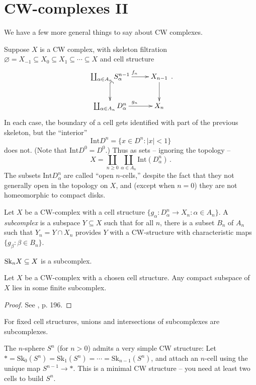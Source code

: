 \section{CW-complexes II}

We have a few more general things to say about CW complexes. 

Suppose $X$ is a CW complex, with skeleton filtration 
$\varnothing=X_{-1}\subseteq X_0\subseteq X_1\subseteq\cdots\subseteq X$ and 
cell structure
\begin{equation*}
\xymatrix{\coprod_{\alpha\in A_n}S^{n-1}_\alpha\ar[r]^{f_n}\ar@{^(->}[d] & X_{n-1}\ar[d]\\
\coprod_{\alpha\in A_n}D^n_\alpha\ar[r]^{g_n} & X_{n}}\,.
\end{equation*}
In each case, the boundary of a cell gets identified with part of the previous skeleton, but the ``interior''
\[
\mathrm{Int}D^n=\{x\in D^n:|x|<1\}
\]
does not. (Note that $\mathrm{Int}D^0=D^0$.) Thus as sets -- ignoring
the topology -- 
\[
X=\coprod_{n\geq 0}\coprod_{\alpha\in A_n}\mathrm{Int}(D^n_\alpha)\,.
\]
The subsets $\mathrm{Int}D^n_\alpha$ are called ``open $n$-cells,'' 
despite the fact that they not generally open in the topology on $X$,
and (except when $n=0$) they are not homeomorphic to compact disks.

\begin{definition}
Let $X$ be a CW-complex with a cell structure 
$\{g_\alpha:D^n_\alpha\to X_n:\alpha\in A_n\}$. A {\em subcomplex} is a subspace $Y\subseteq X$ such that for all $n$, there is a subset $B_n$ of $A_n$ such that $Y_n=Y\cap X_n$ provides $Y$ with a CW-structure with characteristic maps $\{g_\beta:\beta\in B_n\}$.
\end{definition}
\begin{example}
$\mathrm{Sk}_nX\subseteq X$ is a subcomplex.
\end{example}
\begin{prop}
Let $X$ be a CW-complex with a chosen cell structure. Any compact subspace
of $X$ lies in some finite subcomplex. 
\end{prop}
\begin{proof}
See \cite{bredon}, p. 196.
\end{proof}
\begin{remark}
For fixed cell structures, unions and intersections of subcomplexes are subcomplexes.
\end{remark}

The $n$-sphere $S^n$ (for $n>0$) 
admits a very simple CW structure:
Let $\ast=\mathrm{Sk}_0(S^n)=\mathrm{Sk}_1(S^n)=\cdots=\mathrm{Sk}_{n-1}(S^n)$,
and attach an $n$-cell using the unique map $S^{n-1}\to\ast$. This is a 
minimal CW structure -- you need at least two cells to build $S^n$. 

